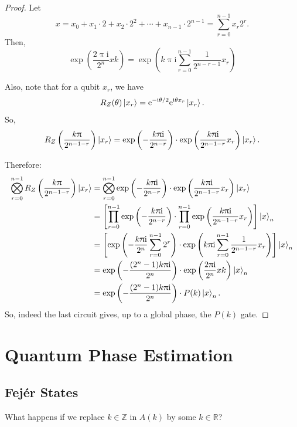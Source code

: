 \documentclass[12pt]{amsart}
\theoremstyle{plain}
\theoremstyle{definition}
\theoremstyle{remarks}
\newcommand{\R}{\mathbb{R}}
\newcommand{\Z}{\mathbb{Z}}
\newcommand{\me}{\mathrm{e}}
\newcommand{\mi}{\mathrm{i}}
\newcommand{\mpi}{\uppi}
\begin{document}
\begin{proof}
  Let
  \[
    x = x_0 + x_1 \cdot 2 + x_2 \cdot 2^2 + \cdots + x_{n-1} \cdot 2^{n-1} = \sum_{r=0}^{n-1} x_r 2^r.
  \]
  Then,
  \begin{equation}\label{eq:exp1}
    \exp\left(\frac{2 \mpi \mi}{2^n} xk \right) = \exp\left(k \mpi \mi \sum_{r=0}^{n-1} \frac{1}{2^{n-r-1}} x_r\right)
  \end{equation}

  Also, note that for a qubit $x_r$, we have
  \[
    R_Z(\theta) \ket{x_r} = \me^{-\mi \theta/2} \me^{\mi \theta x_r} \ket{x_r}.
  \]
  So,
  \[
    R_Z\left(\frac{k \mpi}{2^{n-1-r}}\right) \ket{x_r} = \exp\left(-\frac{k \mpi \mi}{2^{n-r}}\right) \cdot \exp\left(\frac{k \mpi \mi}{2^{n-1-r}} x_r\right) \ket{x_r}.
  \]

  Therefore:
  \begin{align*}
    \bigotimes_{r=0}^{n-1}R_Z\left(\frac{k \mpi} {2^{n-1-r}}\right) \ket{x_r}
    &= \bigotimes_{r=0}^{n-1} \exp\left(-\frac{k \mpi \mi}{2^{n-r}}\right) \cdot \exp\left(\frac{k \mpi \mi}{2^{n-1-r}} x_r\right) \ket{x_r} \\
    &= \left[\prod_{r=0}^{n-1} \exp\left(-\frac{k \mpi \mi}{2^{n-r}}\right) \cdot \prod_{r=0}^{n-1}  \exp\left(\frac{k \mpi \mi}{2^{n-1-r}} x_r\right)\right] \ket{x}_n \\
    &= \left[\exp\left(-\frac{k \mpi \mi}{2^n} \sum_{r=0}^{n-1} 2^r\right) \cdot \exp\left(k \mpi \mi \sum_{r=0}^{n-1}\frac{1}{2^{n-1-r}} x_r\right)\right] \ket{x}_n \\
    &= \exp\left(-\frac{(2^n-1) k \mpi \mi}{2^n}\right) \cdot \exp\left(\frac{2 \mpi \mi}{2^n} xk \right) \ket{x}_n \\
    &= \exp\left(-\frac{(2^n-1) k \mpi \mi}{2^n}\right) \cdot P(k) \ket{x}_n.
  \end{align*}
  So, indeed the last circuit gives, up to a global phase, the $P(k)$ gate.
\end{proof}


\section{Quantum Phase Estimation}

\subsection{Fejér States}

What happens if we replace $k \in \Z$ in $A(k)$ by some $k \in  \R$?
\end{document}
